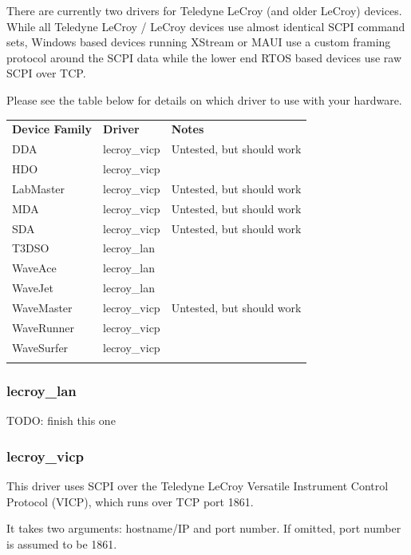 \documentclass[11pt]{article}
\newcommand{\thickhline}{\Xhline{2.5\arrayrulewidth}}
\begin{document}
There are currently two drivers for Teledyne LeCroy (and older LeCroy) devices. While all Teledyne LeCroy / LeCroy
devices use almost identical SCPI command sets, Windows based devices running XStream or MAUI use a custom framing
protocol around the SCPI data while the lower end RTOS based devices use raw SCPI over TCP.

Please see the table below for details on which driver to use with  your hardware.

\begin{tabularx}{16cm}{llX}
\thickhline
\textbf{Device Family} & \textbf{Driver} & \textbf{Notes} \\
\thickhline
DDA & lecroy\_vicp & Untested, but should work \\
\thickhline
HDO & lecroy\_vicp & \\
\thickhline
LabMaster & lecroy\_vicp & Untested, but should work\\
\thickhline
MDA & lecroy\_vicp &  Untested, but should work\\
\thickhline
SDA & lecroy\_vicp &  Untested, but should work\\
\thickhline
T3DSO & lecroy\_lan & \\
\thickhline
WaveAce & lecroy\_lan & \\
\thickhline
WaveJet & lecroy\_lan & \\
\thickhline
WaveMaster & lecroy\_vicp & Untested, but should work \\
\thickhline
WaveRunner & lecroy\_vicp &  \\
\thickhline
WaveSurfer & lecroy\_vicp &  \\
\thickhline
\end{tabularx}

\subsubsection{lecroy\_lan}

TODO: finish this one

\subsubsection{lecroy\_vicp}

This driver uses SCPI over the Teledyne LeCroy Versatile Instrument Control Protocol (VICP), which runs over TCP port
1861.

It takes two arguments: hostname/IP and port number. If omitted, port number is assumed to be 1861.
\end{document}
